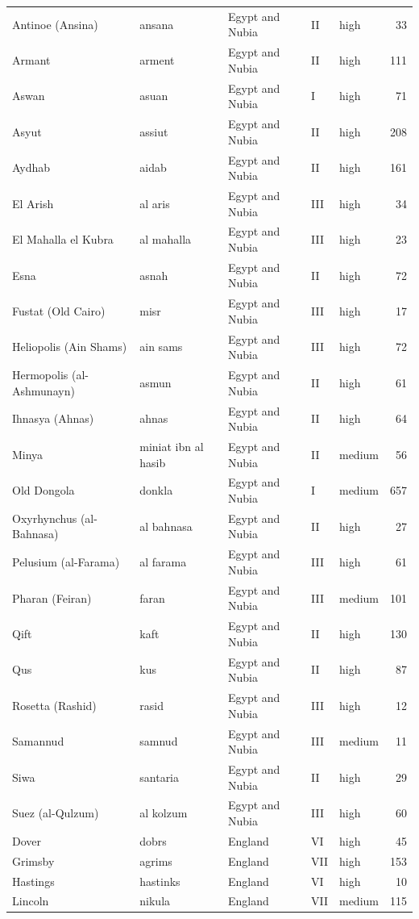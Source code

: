 \documentclass[11pt,a4paper]{article}
\begin{document}
{\begin{longtable}{p{4.6cm}p{3.0cm}p{3.6cm}llr}
Antinoe (Ansina) & ansana & Egypt and Nubia & II & high & 33\\
Armant & arment & Egypt and Nubia & II & high & 111\\
Aswan & asuan & Egypt and Nubia & I & high & 71\\
Asyut & assiut & Egypt and Nubia & II & high & 208\\
Aydhab & aidab & Egypt and Nubia & II & high & 161\\
El Arish & al aris & Egypt and Nubia & III & high & 34\\
El Mahalla el Kubra & al mahalla & Egypt and Nubia & III & high & 23\\
Esna & asnah & Egypt and Nubia & II & high & 72\\
Fustat (Old Cairo) & misr & Egypt and Nubia & III & high & 17\\
Heliopolis (Ain Shams) & ain sams & Egypt and Nubia & III & high & 72\\
Hermopolis (al-Ashmunayn) & asmun & Egypt and Nubia & II & high & 61\\
Ihnasya (Ahnas) & ahnas & Egypt and Nubia & II & high & 64\\
Minya & miniat ibn al hasib & Egypt and Nubia & II & medium & 56\\
Old Dongola & donkla & Egypt and Nubia & I & medium & 657\\
Oxyrhynchus (al-Bahnasa) & al bahnasa & Egypt and Nubia & II & high & 27\\
Pelusium (al-Farama) & al farama & Egypt and Nubia & III & high & 61\\
Pharan (Feiran) & faran & Egypt and Nubia & III & medium & 101\\
Qift & kaft & Egypt and Nubia & II & high & 130\\
Qus & kus & Egypt and Nubia & II & high & 87\\
Rosetta (Rashid) & rasid & Egypt and Nubia & III & high & 12\\
Samannud & samnud & Egypt and Nubia & III & medium & 11\\
Siwa & santaria & Egypt and Nubia & II & high & 29\\
Suez (al-Qulzum) & al kolzum & Egypt and Nubia & III & high & 60\\
Dover & dobrs & England & VI & high & 45\\
Grimsby & agrims & England & VII & high & 153\\
Hastings & hastinks & England & VI & high & 10\\
Lincoln & nikula & England & VII & medium & 115\\

\end{longtable}}
\end{document}
